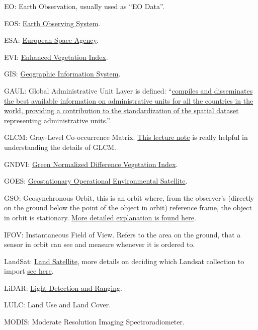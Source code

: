 \documentclass[
  letterpaper,
  DIV=11,
  numbers=noendperiod]{scrreprt}
\begin{document}
EO: Earth Observation, usually used as ``EO Data''.

EOS:
\href{https://eospso.nasa.gov/content/nasas-earth-observing-system-project-science-office}{Earth
Observing System}.

ESA: \href{https://www.esa.int/}{European Space Agency}.

EVI: \protect\hyperlink{week-3-atmosphere-corrections}{Enhanced
Vegetation Index}.

GIS:
\href{https://www.usgs.gov/faqs/what-geographic-information-system-gis}{Geographic
Information System}.

GAUL: Global Administrative Unit Layer is defined:
``\href{https://data.apps.fao.org/catalog/iso/1c45d658-591c-455c-b29c-cda8bc161f72}{compiles
and disseminates the best available information on administrative units
for all the countries in the world, providing a contribution to the
standardization of the spatial dataset representing administrative
units.}''.

GLCM: Gray-Level Co-occurrence Matrix.
\href{https://web.pdx.edu/~jduh/courses/Archive/geog481w07/Students/Hayes_GreyScaleCoOccurrenceMatrix.pdf}{This
lecture note} is really helpful in understanding the details of GLCM.

GNDVI: \protect\hyperlink{week-3-atmosphere-corrections}{Green
Normalized Difference Vegetation Index}.

GOES: \href{https://science.nasa.gov/mission/goes/}{Geostationary
Operational Environmental Satellite}.

GSO: Geosynchronous Orbit, this is an orbit where, from the observer's
(directly on the ground below the point of the object in orbit)
reference frame, the object in orbit is stationary.
\href{https://science.nasa.gov/learn/basics-of-space-flight/chapter5-1/}{More
detailed explanation is found here}.

IFOV: Instantaneous Field of View. Refers to the area on the ground,
that a sensor in orbit can see and measure whenever it is ordered to.

LandSat: \href{https://en.wikipedia.org/wiki/Landsat_program}{Land
Satellite}, more details on deciding which Landsat collection to import
\href{https://calekochenour.github.io/remote-sensing-textbook/01-catalog/chapter01-landsat.html}{see
here}.

LiDAR: \href{https://en.wikipedia.org/wiki/Lidar}{Light Detection and
Ranging}.

LULC: Land Use and Land Cover.

MODIS: Moderate Resolution Imaging Spectroradiometer.
\end{document}
